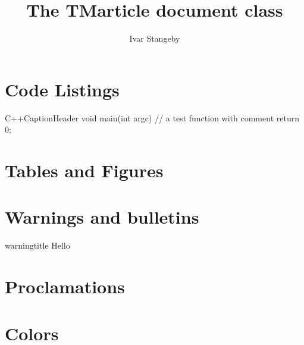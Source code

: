 \documentclass{TMarticle}
\author{Ivar Stangeby}
\title{The TMarticle document class}
\begin{document}
\maketitle
\section{Code Listings}

\begin{TMcode}{C++}{Caption}{Header}
void main(int argc) {
    // a test function with comment
    return 0;
}
\end{TMcode}

\section{Tables and Figures}

\section{Warnings and bulletins}

\begin{TMbulletin}{warning}{title}{}
   Hello 
\end{TMbulletin}
\section{Proclamations}
\section{Colors}
\end{document}
